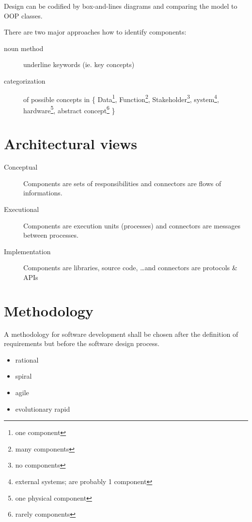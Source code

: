 \documentclass[a4paper]{report}
\begin{document}
Design can be codified by box-and-lines diagrams and comparing the model to
OOP classes.

There are two major approaches how to identify components:

\begin{description}
  \item[noun method] underline keywords (ie. key concepts)
  \item[categorization] of possible concepts in
    \{
        Data\footnote{one component},
        Function\footnote{many components},
        Stakeholder\footnote{no components}, 
        system\footnote{external systems; are probably 1 component}, 
        hardware\footnote{one physical component}, 
        abstract concept\footnote{rarely components}
    \}
\end{description}

\section{Architectural views}

\begin{description}
  \item[Conceptual] Components are sets of responsibilities and connectors
                    are flows of informations.
  \item[Executional] Components are execution units (processes) and
                     connectors are messages between processes.
  \item[Implementation] Components are libraries, source code, \dots and
                        connectors are protocols \& APIs
\end{description}

\section{Methodology}

A methodology for software development shall be chosen after the definition
of requirements but before the software design process.

\begin{itemize}
  \item rational
  \item spiral
  \item agile
  \item evolutionary rapid
\end{itemize}
\end{document}
